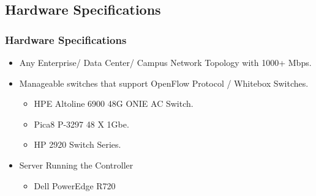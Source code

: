 \documentclass[10pt]{beamer}
\begin{document}
\begin{frame}
\section[]{Hardware Specifications}
\frametitle{Hardware Specifications}
\begin{itemize}
\footnotesize
\item
Any Enterprise/ Data Center/ Campus Network Topology with 1000+ Mbps.
\item
Manageable switches that support OpenFlow Protocol / Whitebox Switches.
\begin{itemize}
\footnotesize
\item
HPE Altoline 6900 48G ONIE AC Switch.
\item
Pica8 P-3297 48 X 1Gbe.
\item
HP 2920 Switch Series.
\end{itemize}

\item
Server Running the Controller
\begin{itemize}
\footnotesize
\item
Dell PowerEdge R720
\end{itemize}

\end{itemize}
\end{frame}
\end{document}
